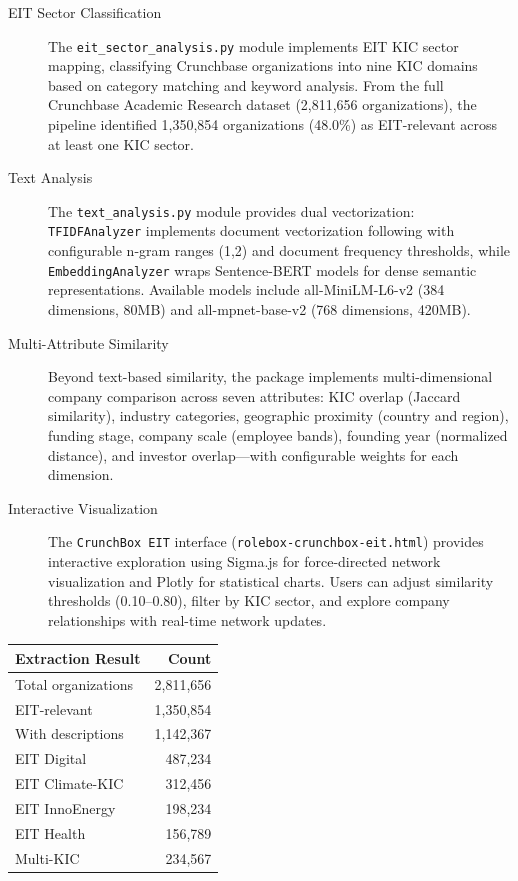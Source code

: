 \documentclass[../main.tex]{subfiles}
\begin{document}
\begin{description}
    \item[EIT Sector Classification] The \texttt{eit\_sector\_analysis.py} module implements EIT KIC sector mapping, classifying Crunchbase organizations into nine KIC domains based on category matching and keyword analysis. From the full Crunchbase Academic Research dataset (2,811,656 organizations), the pipeline identified 1,350,854 organizations (48.0\%) as EIT-relevant across at least one KIC sector.

    \item[Text Analysis] The \texttt{text\_analysis.py} module provides dual vectorization: \texttt{TFIDFAnalyzer} implements document vectorization following \cite{basole2019visual} with configurable n-gram ranges (1,2) and document frequency thresholds, while \texttt{EmbeddingAnalyzer} wraps Sentence-BERT models for dense semantic representations. Available models include all-MiniLM-L6-v2 (384 dimensions, 80MB) and all-mpnet-base-v2 (768 dimensions, 420MB).

    \item[Multi-Attribute Similarity] Beyond text-based similarity, the package implements multi-dimensional company comparison across seven attributes: KIC overlap (Jaccard similarity), industry categories, geographic proximity (country and region), funding stage, company scale (employee bands), founding year (normalized distance), and investor overlap---with configurable weights for each dimension.

    \item[Interactive Visualization] The \texttt{CrunchBox EIT} interface (\texttt{rolebox-crunchbox-eit.html}) provides interactive exploration using Sigma.js for force-directed network visualization and Plotly for statistical charts. Users can adjust similarity thresholds (0.10--0.80), filter by KIC sector, and explore company relationships with real-time network updates.
\end{description}

\begin{margintable}
\centering
\small
\begin{tabular}{lr}
\toprule
\textbf{Extraction Result} & \textbf{Count} \\
\midrule
Total organizations & 2,811,656 \\
EIT-relevant & 1,350,854 \\
With descriptions & 1,142,367 \\
EIT Digital & 487,234 \\
EIT Climate-KIC & 312,456 \\
EIT InnoEnergy & 198,234 \\
EIT Health & 156,789 \\
Multi-KIC & 234,567 \\
\bottomrule
\end{tabular}
\caption{Full Crunchbase extraction results}
\end{margintable}
\end{document}
